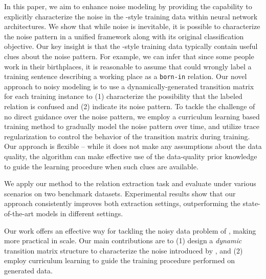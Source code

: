 In this paper, we aim to enhance \DS noise modeling by providing the capability to explicitly characterize
the noise in the \DS-style training data within neural network architectures.  We show that while noise is inevitable, it is possible to characterize the noise pattern  in a unified framework along with its original classification objective. Our key insight is that the \DS-style training  data typically contain useful clues about the noise pattern. For example, we can infer that since some people work in their birthplaces, it is reasonable to assume that \DS could wrongly label a training sentence describing a working place as a \texttt{born-in} relation.
Our novel approach to noisy modeling is to use a dynamically-generated transition matrix for each training instance to (1) characterize the possibility that the \DS labeled relation is confused and (2) indicate its noise pattern.  To tackle the challenge of no direct guidance over the noise pattern, we employ a curriculum learning based training method to gradually model the noise pattern over time, and utilize trace regularization to control the behavior of the transition matrix during training. Our approach is flexible -- while it does not make any assumptions about the data quality, the algorithm can make effective use
of the data-quality prior knowledge to guide the learning procedure when such clues are available.

We apply our method to the relation extraction task and evaluate under various scenarios on two benchmark datasets. Experimental results show that our approach consistently improves both extraction settings, outperforming the state-of-the-art models in different settings.

Our work offers an effective way for tackling the noisy data problem of \DS, making \DS more practical in scale. Our main contributions are to (1) design a \emph{dynamic} transition matrix structure to characterize the noise introduced by \DS, and (2) employ curriculum learning to guide the training procedure performed on \DS generated data.


